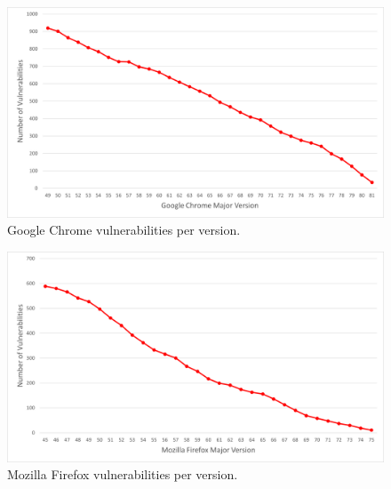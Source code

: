\begin{figure}[ht]
    \centering
    \includegraphics[width=\columnwidth]{figures/Chrome-Vulnerabilities.png}
    \caption{Google Chrome vulnerabilities per version.}
    \label{fig:chrome-vuln}
\end{figure}

\begin{figure}[ht]
    \centering
    \includegraphics[width=\columnwidth]{figures/Firefox-Vulnerabilities.png}
    \caption{Mozilla Firefox vulnerabilities per version.}
    \label{fig:firefox-vuln}
\end{figure}


